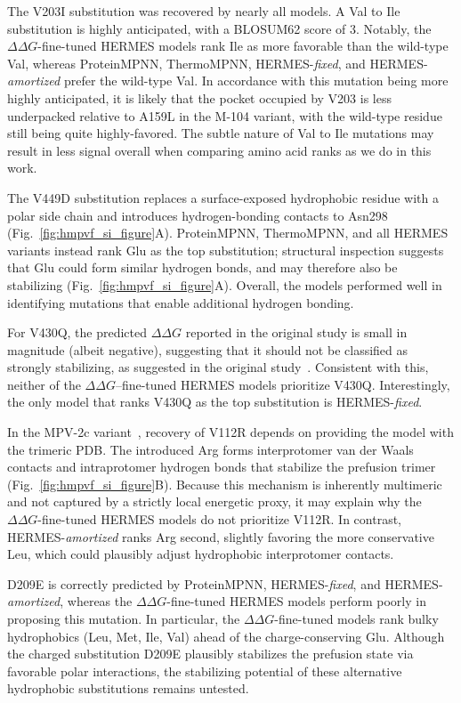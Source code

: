 The V203I substitution was recovered by nearly all models. A Val to Ile substitution is highly
anticipated, with a BLOSUM62 score of 3. Notably, the $\Delta\Delta G$-fine-tuned HERMES models rank
Ile as more favorable than the wild-type Val, whereas ProteinMPNN, ThermoMPNN,
HERMES-\textit{fixed}, and HERMES-\textit{amortized} prefer the wild-type Val. In accordance with
this mutation being more highly anticipated, it is likely that the pocket occupied by V203 is less
underpacked relative to A159L in the M-104 variant, with the wild-type residue still being quite
highly-favored. The subtle nature of Val to Ile mutations may result in less signal overall when
comparing amino acid ranks as we do in this work.


The V449D substitution replaces a surface-exposed hydrophobic residue with a polar side chain and
introduces hydrogen-bonding contacts to Asn298 (Fig.~\ref{fig:hmpvf_si_figure}A). ProteinMPNN,
ThermoMPNN, and all HERMES variants instead rank Glu as the top substitution; structural inspection
suggests that Glu could form similar hydrogen bonds, and may therefore also be stabilizing
(Fig.~\ref{fig:hmpvf_si_figure}A). Overall, the models performed well in identifying mutations that
enable additional hydrogen bonding.


For V430Q, the predicted $\Delta\Delta G$ reported in the original study is small in magnitude
(albeit negative), suggesting that it should not be classified as strongly stabilizing, as suggested
in the original study~\citep{gonzalez_general_2024}. Consistent with this, neither of the
$\Delta\Delta G$–fine-tuned HERMES models prioritize V430Q. Interestingly, the only model that ranks
V430Q as the top substitution is HERMES-\textit{fixed}.


In the MPV-2c variant~\citep{bakkers_efficacious_2024}, recovery of V112R depends on providing the
model with the trimeric PDB. The introduced Arg forms interprotomer van der Waals contacts and
intraprotomer hydrogen bonds that stabilize the prefusion trimer (Fig.~\ref{fig:hmpvf_si_figure}B).
Because this mechanism is inherently multimeric and not captured by a strictly local energetic
proxy, it may explain why the $\Delta\Delta G$-fine-tuned HERMES models do not prioritize V112R. In
contrast, HERMES-\textit{amortized} ranks Arg second, slightly favoring the more conservative Leu,
which could plausibly adjust hydrophobic interprotomer contacts.


D209E is correctly predicted by ProteinMPNN, HERMES-\textit{fixed}, and HERMES-\textit{amortized},
whereas the $\Delta\Delta G$-fine-tuned HERMES models perform poorly in proposing this mutation. In
particular, the $\Delta\Delta G$-fine-tuned models rank bulky hydrophobics (Leu, Met, Ile, Val)
ahead of the charge-conserving Glu. Although the charged substitution D209E plausibly stabilizes the
prefusion state via favorable polar interactions, the stabilizing potential of these alternative
hydrophobic substitutions remains untested.




